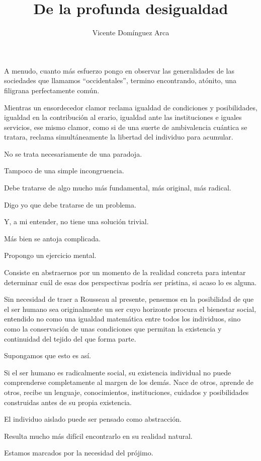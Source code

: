 \documentclass[12pt,a4paper]{article}
\title{De la profunda desigualdad}
\author{Vicente Domínguez Arca}
\date{}
\begin{document}
\maketitle

A menudo, cuanto más esfuerzo pongo en observar las generalidades de las sociedades que llamamos ``occidentales'', termino encontrando, atónito, una filigrana perfectamente común.

Mientras un ensordecedor clamor reclama igualdad de condiciones y posibilidades, igualdad en la contribución al erario, igualdad ante las instituciones e iguales servicios, ese mismo clamor, como si de una suerte de ambivalencia cuántica se tratara, reclama simultáneamente la libertad del individuo para acumular.

No se trata necesariamente de una paradoja.

Tampoco de una simple incongruencia.

Debe tratarse de algo mucho más fundamental, más original, más radical.

Digo yo que debe tratarse de un problema.

Y, a mi entender, no tiene una solución trivial.

Más bien se antoja complicada.

Propongo un ejercicio mental.

Consiste en abstraernos por un momento de la realidad concreta para intentar determinar cuál de esas dos perspectivas podría ser prístina, si acaso lo es alguna.

Sin necesidad de traer a Rousseau al presente, pensemos en la posibilidad de que el ser humano sea originalmente un ser cuyo horizonte procura el bienestar social, entendido no como una igualdad matemática entre todos los individuos, sino como la conservación de unas condiciones que permitan la existencia y continuidad del tejido del que forma parte.

Supongamos que esto es así.

Si el ser humano es radicalmente social, su existencia individual no puede comprenderse completamente al margen de los demás. Nace de otros, aprende de otros, recibe un lenguaje, conocimientos, instituciones, cuidados y posibilidades construidas antes de su propia existencia.

El individuo aislado puede ser pensado como abstracción.

Resulta mucho más difícil encontrarlo en su realidad natural.

Estamos marcados por la necesidad del prójimo.
\end{document}
